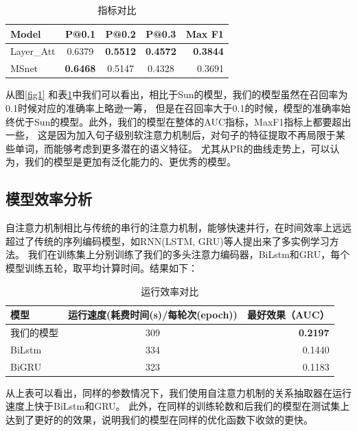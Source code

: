 \documentclass[UTF8]{csoarticle}
\begin{document}
\begin{table}
\begin{center}

\begin{tabular}{l||c|c|c|r|}
Model & P@0.1 & P@0.2 & P@0.3 & Max F1\\
\hline
Layer\_Att& 0.6379          & \textbf{0.5512}& \textbf{0.4572}& \textbf{0.3844} \\
MSnet     & \textbf{0.6468} & 0.5147         & 0.4328          & 0.3691 \\
\end{tabular}
\end{center}

\caption{指标对比}
\label{tab1}
\end{table}


从图\ref {fig1} 和表\ref {tab1}中我们可以看出，相比于Sun\cite{bib12}的模型，我们的模型虽然在召回率为0.1时候对应的准确率上略逊一筹，
但是在召回率大于0.1的时候，模型的准确率始终优于Sun的模型。此外，我们的模型在整体的AUC指标，MaxF1指标上都要超出一些，
这是因为加入句子级别软注意力机制后，对句子的特征提取不再局限于某些单词，而能够考虑到更多潜在的语义特征。
尤其从PR的曲线走势上，可以认为，我们的模型是更加有泛化能力的、更优秀的模型。
\subsection{模型效率分析}
自注意力机制相比与传统的串行的注意力机制，能够快速并行，在时间效率上远远超过了传统的序列编码模型，如RNN(LSTM, GRU)等人提出来了多实例学习方法。
我们在训练集上分别训练了我们的多头注意力编码器，BiLstm和GRU，每个模型训练五轮，取平均计算时间。结果如下：

\begin{table}[!htbp]
\begin{center}
    \begin{tabular}{|l|c|r|}
    模型 & 运行速度(耗费时间(s)/每轮次(epoch)) & 最好效果（AUC）\\
    \hline  
    我们的模型 &309 & \textbf{0.2197}  \\
    BiLstm & 334& 0.1440\\
    BiGRU & 323& 0.1183\\
    \end{tabular}
    \caption{运行效率对比}
\end{center}

\end{table}

从上表可以看出，同样的参数情况下，我们使用自注意力机制的关系抽取器在运行速度上快于BiLstm和GRU。
此外，在同样的训练轮数和后我们的模型在测试集上达到了更好的的效果，说明我们的模型在同样的优化函数下收敛的更快。
\end{document}
